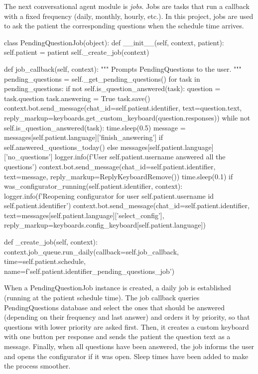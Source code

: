 \documentclass[12pt,english]{article}
\begin{document}
The next conversational agent module is \emph{jobs}. Jobs are tasks that run a callback with a fixed frequency (daily, monthly, hourly, etc.). In this project, jobs are used to ask the patient the corresponding questions when the schedule time arrives.
\newpage

\begin{python}[caption={PendingQuestion job}, captionpos=b]
class PendingQuestionJob(object):
  def __init__(self, context, patient):
      self.patient = patient
      self._create_job(context)

  def job_callback(self, context):
      """
      Prompts PendingQuestions to the user.
      """
      pending_questions = self._get_pending_questions()
      for task in pending_questions:
          if not self.is_question_answered(task):
              question = task.question
              task.answering = True
              task.save()
              context.bot.send_message(chat_id=self.patient.identifier, text=question.text, reply_markup=keyboards.get_custom_keyboard(question.responses))
              while not self.is_question_answered(task):
                  time.sleep(0.5)
      message = messages[self.patient.language]['finish_answering'] if self.answered_questions_today() else messages[self.patient.language]['no_questions']
      logger.info(f'User {self.patient.username} answered all the questions')
      context.bot.send_message(chat_id=self.patient.identifier, text=message, reply_markup=ReplyKeyboardRemove())
      time.sleep(0.1)
      if was_configurator_running(self.patient.identifier, context):
          logger.info(f'Reopening configurator for user {self.patient.username} id {self.patient.identifier}')
          context.bot.send_message(chat_id=self.patient.identifier,  text=messages[self.patient.language]['select_config'], reply_markup=keyboards.config_keyboard[self.patient.language])

  def _create_job(self, context):
      context.job_queue.run_daily(callback=self.job_callback, time=self.patient.schedule, name=f'{self.patient.identifier}_pending_questions_job')
\end{python}

When a PendingQuestionJob instance is created, a daily job is established (running at the patient schedule time). The job callback queries PendingQuestions database and select the ones that should be answered (depending on their frequency and last answer) and orders it by priority, so that questions with lower priority are asked first. Then, it creates a custom keyboard with one button per response and sends the patient the question text as a message. Finally, when all questions have been answered, the job informs the user and opens the configurator if it was open. Sleep times have been added to make the process smoother.
\end{document}
